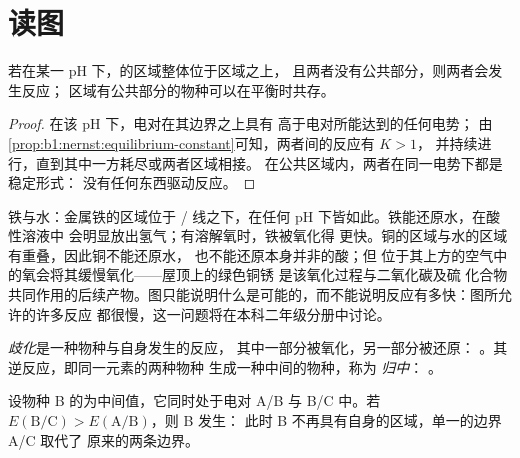 \section{读图}\label{sec:b1:e-ph-diagrams:reading}

\begin{proposition}[不相交区域]\label{prop:b1:e-ph-diagrams:disjoint-domains}
若在某一 pH 下，的区域整体位于区域之上，
且两者没有公共部分，则两者会发生反应；
区域有公共部分的物种可以在平衡时共存。
\end{proposition}

\begin{proof}
在该 pH 下，电对在其边界之上具有
高于电对所能达到的任何电势；
由\cref{prop:b1:nernst:equilibrium-constant}可知，两者间的反应有 $K > 1$，
并持续进行，直到其中一方耗尽或两者区域相接。
在公共区域内，两者在同一电势下都是稳定形式：
没有任何东西驱动反应。
\end{proof}

铁与水：金属铁的区域位于
/ 线之下，在任何 pH 下皆如此。铁能还原水，在酸性溶液中
会明显放出氢气；有溶解氧时，铁被氧化得
更快。铜的区域与水的区域有重叠，因此铜不能还原水，
也不能还原本身并非的酸；但
位于其上方的空气中的氧会将其缓慢氧化——屋顶上的绿色铜锈
是该氧化过程与二氧化碳及硫
化合物共同作用的后续产物。图只能说明什么是可能的，而不能说明反应有多快：图所允许的许多反应
都很慢，这一问题将在本科二年级分册中讨论。

\begin{definition}[歧化、归中]\label{def:b1:e-ph-diagrams:disproportionation}
\emph{歧化}是一种物种与自身发生的反应，
其中一部分被氧化，另一部分被还原：
。其逆反应，即同一元素的两种物种
生成一种中间的物种，称为
\emph{归中}：
。
\end{definition}

\begin{proposition}[歧化判据]\label{prop:b1:e-ph-diagrams:disproportionation-criterion}
设物种 B 的为中间值，它同时处于电对 A/B 与
B/C 中。若 $E(\mathrm{B}/\mathrm{C}) > E(\mathrm{A}/\mathrm{B})$，则 B 发生：
此时 B 不再具有自身的区域，单一的边界 A/C 取代了
原来的两条边界。
\end{proposition}

